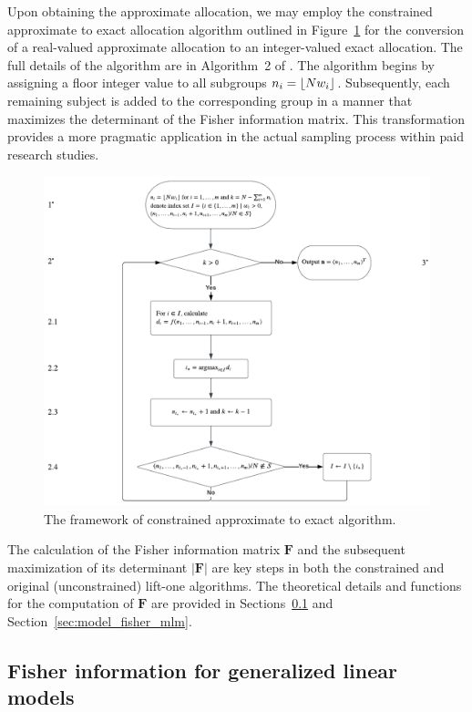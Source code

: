 Upon obtaining the approximate allocation, we may employ the constrained approximate to exact allocation algorithm outlined in Figure~\ref{fig:approx_to_exact_algo} for the conversion of a real-valued approximate allocation to an integer-valued exact allocation. The full details of the algorithm are in Algorithm~2 of \citet{huang2023constrained}. The algorithm begins by assigning a floor integer value to all subgroups $n_i = \lfloor Nw_i\rfloor$. Subsequently, each remaining subject is added to the corresponding group in a manner that maximizes the determinant of the Fisher information matrix. This transformation provides a more pragmatic application in the actual sampling process within paid research studies.

\begin{figure}[htb!]
    \centering
    \includegraphics[width=\textwidth]{figures/approx_to_exact.png}
    \caption{The framework of constrained approximate to exact algorithm.}
    \label{fig:approx_to_exact_algo}
\end{figure}

The calculation of the Fisher information matrix $\mathbf{F}$ and the subsequent maximization of its determinant $|\mathbf{F}|$ are key steps in both the constrained and original (unconstrained) lift-one algorithms. The theoretical details and functions for the computation of $\mathbf{F}$ are provided in Sections~\ref{sec:model_fisher_glm} and Section~\ref{sec:model_fisher_mlm}.

\subsection{Fisher information for generalized linear models} \label{sec:model_fisher_glm}

